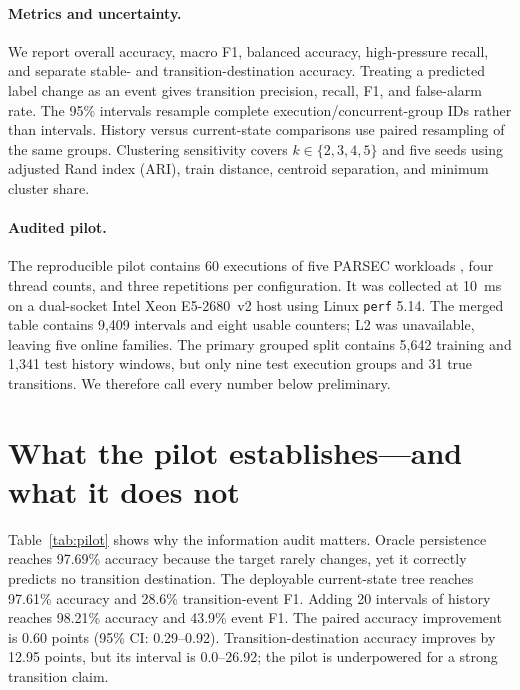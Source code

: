 \documentclass{article}
\begin{document}
\paragraph{Metrics and uncertainty.}
We report overall accuracy, macro F1, balanced accuracy, high-pressure recall, and
separate stable- and transition-destination accuracy. Treating a predicted label
change as an event gives transition precision, recall, F1, and false-alarm rate. The
95\% intervals resample complete execution/concurrent-group IDs rather than intervals.
History versus current-state comparisons use paired resampling of the same groups.
Clustering sensitivity covers $k\in\{2,3,4,5\}$ and five seeds using adjusted Rand
index (ARI), train distance, centroid separation, and minimum cluster share.

\paragraph{Audited pilot.}
The reproducible pilot contains 60 executions of five PARSEC workloads
\citep{bienia2008parsec}, four thread counts, and three repetitions per configuration.
It was collected at 10~ms on a dual-socket Intel Xeon E5-2680~v2 host using Linux
\texttt{perf} 5.14. The merged table contains 9,409 intervals and eight usable
counters; L2 was unavailable, leaving five online families. The primary grouped split
contains 5,642 training and 1,341 test history windows, but only nine test execution
groups and 31 true transitions. We therefore call every number below preliminary.

\section{What the pilot establishes---and what it does not}

Table~\ref{tab:pilot} shows why the information audit matters. Oracle persistence
reaches 97.69\% accuracy because the target rarely changes, yet it correctly predicts
no transition destination. The deployable current-state tree reaches 97.61\% accuracy
and 28.6\% transition-event F1. Adding 20 intervals of history reaches 98.21\%
accuracy and 43.9\% event F1. The paired accuracy improvement is 0.60 points (95\% CI:
0.29--0.92). Transition-destination accuracy improves by 12.95 points, but its
interval is 0.0--26.92; the pilot is underpowered for a strong transition claim.
\end{document}
